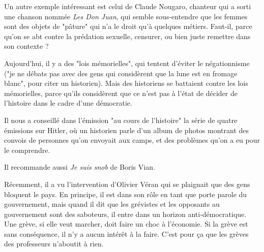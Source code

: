 \documentclass[a4paper,12pt]{book}
\begin{document}
\par Un autre exemple intéressant est celui de Claude Nougaro, chanteur qui a sorti une chanson nommée \textit{Les Don Juan}, qui semble sous-entendre que les femmes sont des objets de "pâture" qui n'a le droit qu'à quelques métiers. Faut-il, parce qu'on se abt contre la prédation sexuelle, censurer, ou bien juste remettre dans son contexte ?
\par Aujourd'hui, il y a des "lois mémorielles", qui tentent d'éviter le négationnisme ("je ne débats pas avec des gens qui considèrent que la lune est en fromage blanc", pour citer un historien). Mais des historiens se battaient contre les lois mémorielles, parce qu'ils considèrent que ce n'est pas à l'état de décider de l'histoire dans le cadre d'une démocratie.
\par Il nous a conseillé dans l'émission "au cours de l'histoire" la série de quatre émissions sur Hitler, où un historien parle d'un album de photos montrant des convois de personnes qu'on envoyait aux camps, et des problèmes qu'on a eu pour le comprendre.
\par Il recommande aussi \textit{Je suis snob} de Boris Vian.
\par Récemment, il a vu l'intervention d'Olivier Véran qui se plaignait que des gens bloquent le pays. En principe, il est dans son rôle en tant que porte parole du gouvernement, mais quand il dit que les grévistes et les opposants au gouvernement sont des saboteurs, il entre dans un horizon anti-démocratique. Une grève, si elle veut marcher, doit faire un choc à l'économie. Si la grève est sans conséquence, il n'y a aucun intérêt à la faire. C'est pour ça que les grèves des professeurs n'aboutit à rien.
\end{document}
